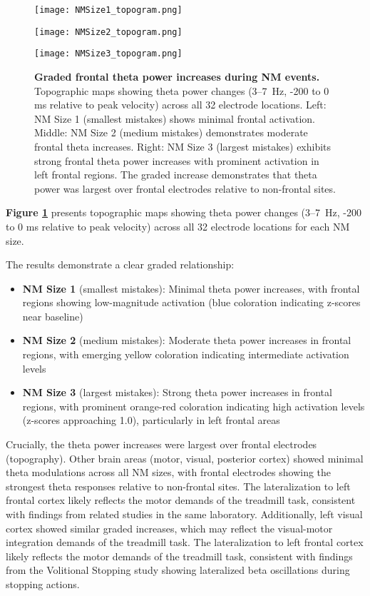 \documentclass[11pt]{article}
\begin{document}
\begin{figure}[H]
\centering
\begin{minipage}{0.3\textwidth}
\centering
\texttt{[image: NMSize1\_topogram.png]}
\end{minipage}
\hfill
\begin{minipage}{0.3\textwidth}
\centering
\texttt{[image: NMSize2\_topogram.png]}
\end{minipage}
\hfill
\begin{minipage}{0.3\textwidth}
\centering
\texttt{[image: NMSize3\_topogram.png]}
\end{minipage}
\caption{\textbf{Graded frontal theta power increases during NM events.} Topographic maps showing theta power changes (3--7~Hz, -200 to 0 ms relative to peak velocity) across all 32 electrode locations. Left: NM Size 1 (smallest mistakes) shows minimal frontal activation. Middle: NM Size 2 (medium mistakes) demonstrates moderate frontal theta increases. Right: NM Size 3 (largest mistakes) exhibits strong frontal theta power increases with prominent activation in left frontal regions. The graded increase demonstrates that theta power was largest over frontal electrodes relative to non-frontal sites.}
\label{fig:frontal_theta}
\end{figure}

\textbf{Figure \ref{fig:frontal_theta}} presents topographic maps showing theta power changes (3--7~Hz, -200 to 0 ms relative to peak velocity) across all 32 electrode locations for each NM size.

The results demonstrate a clear graded relationship: \begin{itemize}
\item \textbf{NM Size 1} (smallest mistakes): Minimal theta power increases, with frontal regions showing low-magnitude activation (blue coloration indicating z-scores near baseline)
\item \textbf{NM Size 2} (medium mistakes): Moderate theta power increases in frontal regions, with emerging yellow coloration indicating intermediate activation levels
\item \textbf{NM Size 3} (largest mistakes): Strong theta power increases in frontal regions, with prominent orange-red coloration indicating high activation levels (z-scores approaching 1.0), particularly in left frontal areas
\end{itemize}

Crucially, the theta power increases were largest over frontal electrodes (topography). Other brain areas (motor, visual, posterior cortex) showed minimal theta modulations across all NM sizes, with frontal electrodes showing the strongest theta responses relative to non-frontal sites. The lateralization to left frontal cortex likely reflects the motor demands of the treadmill task, consistent with findings from related studies in the same laboratory. Additionally, left visual cortex showed similar graded increases, which may reflect the visual-motor integration demands of the treadmill task. The lateralization to left frontal cortex likely reflects the motor demands of the treadmill task, consistent with findings from the Volitional Stopping study showing lateralized beta oscillations during stopping actions.
\end{document}
